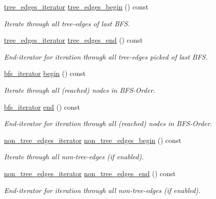 \begin{DoxyCompactItemize}
\mbox{\hyperlink{classbfs_aa0b58a03ca2fc32117948ab27a806bd1}{tree\+\_\+edges\+\_\+iterator}} \mbox{\hyperlink{classbfs_a56959215efdfee1a37826ad315ac13e7}{tree\+\_\+edges\+\_\+begin}} () const
\begin{DoxyCompactList}\small\item\em Iterate through all tree-\/edges of last B\+FS. \end{DoxyCompactList}\item 
\mbox{\hyperlink{classbfs_aa0b58a03ca2fc32117948ab27a806bd1}{tree\+\_\+edges\+\_\+iterator}} \mbox{\hyperlink{classbfs_a7db47d5d68e21e95fd548beea1a8db2b}{tree\+\_\+edges\+\_\+end}} () const
\begin{DoxyCompactList}\small\item\em End-\/iterator for iteration through all tree-\/edges picked of last B\+FS. \end{DoxyCompactList}\item 
\mbox{\hyperlink{classbfs_acafce54954100cc7bc9f80eb318a7bee}{bfs\+\_\+iterator}} \mbox{\hyperlink{classbfs_aff214e6d33f7f2bbd899cf335540def9}{begin}} () const
\begin{DoxyCompactList}\small\item\em Iterate through all (reached) nodes in B\+F\+S-\/\+Order. \end{DoxyCompactList}\item 
\mbox{\hyperlink{classbfs_acafce54954100cc7bc9f80eb318a7bee}{bfs\+\_\+iterator}} \mbox{\hyperlink{classbfs_ac35b3d3c37d33eb80adb752e17a60df9}{end}} () const
\begin{DoxyCompactList}\small\item\em End-\/iterator for iteration through all (reached) nodes in B\+F\+S-\/\+Order. \end{DoxyCompactList}\item 
\mbox{\hyperlink{classbfs_aecd86c7c1f1086d4b6b11c2a0eb12afe}{non\+\_\+tree\+\_\+edges\+\_\+iterator}} \mbox{\hyperlink{classbfs_a06d02d2643f184b4c086678771f0ff90}{non\+\_\+tree\+\_\+edges\+\_\+begin}} () const
\begin{DoxyCompactList}\small\item\em Iterate through all non-\/tree-\/edges (if enabled). \end{DoxyCompactList}\item 
\mbox{\hyperlink{classbfs_aecd86c7c1f1086d4b6b11c2a0eb12afe}{non\+\_\+tree\+\_\+edges\+\_\+iterator}} \mbox{\hyperlink{classbfs_a9fb470cd36eb487004ca28c1723cabda}{non\+\_\+tree\+\_\+edges\+\_\+end}} () const
\begin{DoxyCompactList}\small\item\em End-\/iterator for iteration through all non-\/tree-\/edges (if enabled). \end{DoxyCompactList}\item 

\end{DoxyCompactItemize}
